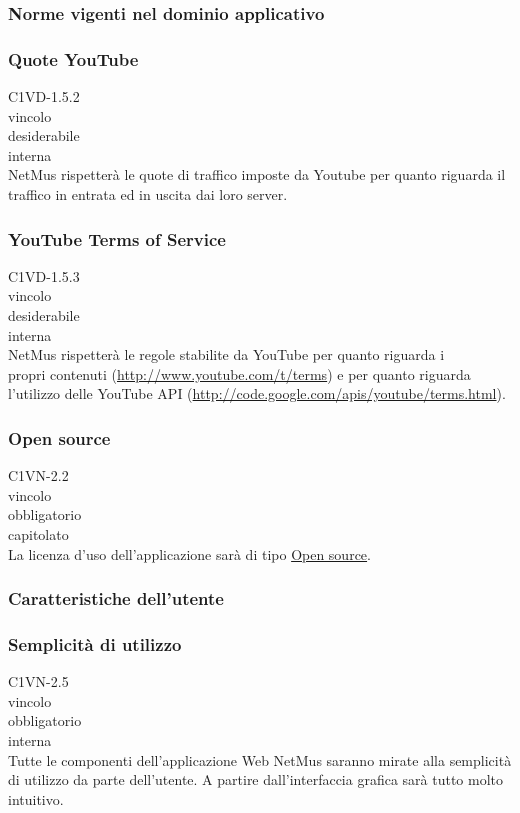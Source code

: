 \subsubsection{Norme vigenti nel dominio applicativo}

\subsubsection*{Quote YouTube}
 C1VD-1.5.2 \\
 vincolo \\
 desiderabile \\
 interna \\
NetMus rispetter\`a le quote di traffico imposte da Youtube per quanto riguarda
il traffico in entrata ed in uscita dai loro server.

\subsubsection*{YouTube Terms of Service}
 C1VD-1.5.3 \\
 vincolo \\
 desiderabile \\
 interna \\
NetMus rispetter\`a le regole stabilite da YouTube per quanto riguarda i\\
propri contenuti (\url{http://www.youtube.com/t/terms}) e per quanto
riguarda l'utilizzo delle YouTube API
(\url{http://code.google.com/apis/youtube/terms.html}).

\subsubsection*{Open source}
 C1VN-2.2 \\
 vincolo \\
 obbligatorio \\
 capitolato \\
La licenza d'uso dell'applicazione sar\`a di tipo \underline{Open source}.

\subsubsection{Caratteristiche dell'utente}

\subsubsection*{Semplicit\`a di utilizzo}
 C1VN-2.5 \\
 vincolo \\
 obbligatorio \\
 interna \\
Tutte le componenti dell'applicazione Web NetMus saranno mirate alla semplicit\`a
di utilizzo da parte dell'utente. A partire dall'interfaccia grafica sar\`a tutto
molto intuitivo.


